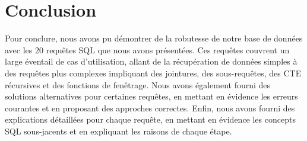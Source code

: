 \section{Conclusion}

Pour conclure, nous avons pu démontrer de la robutesse de notre base de données avec les 20 requêtes SQL que nous avons présentées. Ces requêtes couvrent un large éventail de cas d'utilisation, allant de la récupération de données simples à des requêtes plus complexes impliquant des jointures, des sous-requêtes, des CTE récursives et des fonctions de fenêtrage. Nous avons également fourni des solutions alternatives pour certaines requêtes, en mettant en évidence les erreurs courantes et en proposant des approches correctes. Enfin, nous avons fourni des explications détaillées pour chaque requête, en mettant en évidence les concepts SQL sous-jacents et en expliquant les raisons de chaque étape.